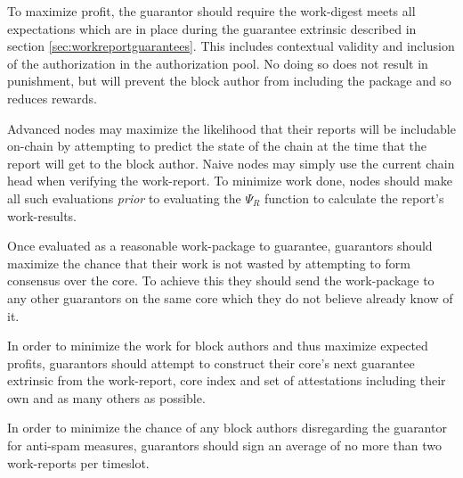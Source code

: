 To maximize profit, the guarantor should require the work-digest meets all expectations which are in place during the guarantee extrinsic described in section \ref{sec:workreportguarantees}. This includes contextual validity and inclusion of the authorization in the authorization pool. No doing so does not result in punishment, but will prevent the block author from including the package and so reduces rewards.

Advanced nodes may maximize the likelihood that their reports will be includable on-chain by attempting to predict the state of the chain at the time that the report will get to the block author. Naive nodes may simply use the current chain head when verifying the work-report. To minimize work done, nodes should make all such evaluations \emph{prior} to evaluating the $\Psi_R$ function to calculate the report's work-results.

Once evaluated as a reasonable work-package to guarantee, guarantors should maximize the chance that their work is not wasted by attempting to form consensus over the core. To achieve this they should send the work-package to any other guarantors on the same core which they do not believe already know of it.

In order to minimize the work for block authors and thus maximize expected profits, guarantors should attempt to construct their core's next guarantee extrinsic from the work-report, core index and set of attestations including their own and as many others as possible.

In order to minimize the chance of any block authors disregarding the guarantor for anti-spam measures, guarantors should sign an average of no more than two work-reports per timeslot.
